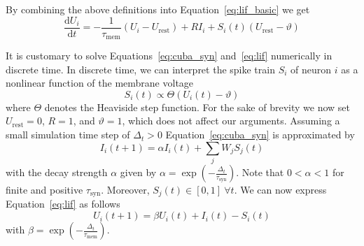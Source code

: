 \documentclass[journal,onecolumn,11pt]{IEEEtran}
\begin{document}
By combining the above definitions into Equation~\eqref{eq:lif_basic} we get 
\begin{equation} 
    \frac{\mathrm{d}U_i}{\mathrm{d}t} = -\frac{1}{\tau_\mathrm{mem}}(U_i-U_\mathrm{rest}) + RI_i + S_i(t)(U_\mathrm{rest}-\vartheta)
    \label{eq:lif}
\end{equation}

It is customary to solve Equations~\eqref{eq:cuba_syn} and~\eqref{eq:lif}
numerically in discrete time.  In discrete time, we can interpret the spike
train $S_i$ of neuron $i$ as a nonlinear function of the membrane voltage
\begin{equation}
    S_i(t)\propto\Theta(U_i(t)-\vartheta)
    \label{eq:spike}
\end{equation}
where $\Theta$ denotes the Heaviside step function.  For the sake of brevity we
now set $U_\mathrm{rest}=0$, $R=1$, and $\vartheta=1$, which does not affect our
arguments.  Assuming a small simulation time step of $\Delta_t>0$
Equation~\eqref{eq:cuba_syn} is approximated by
\begin{equation}
    I_i(t+1) = \alpha I_i(t) + \sum_j W_j S_j(t)
    \label{eq:syn_discrete_time}
\end{equation}
with the decay strength $\alpha$ given by
$\alpha=\exp\left(-\frac{\Delta_t}{\tau_\mathrm{syn}} \right)$.  Note that
$0<\alpha<1$ for finite and positive $\tau_\mathrm{syn}$.  Moreover, $S_j(t) \in
[0,1]~ \forall t$.  We can now express Equation~\eqref{eq:lif} as follows 
\begin{equation}
    U_i(t+1) = \beta U_i(t) + I_i(t) -S_i(t)
    \label{eq:mem_discrete_time}
\end{equation}
with $\beta=\exp\left(-\frac{\Delta_t}{\tau_\mathrm{mem}}\right)$.
\end{document}
